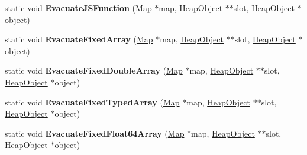 \begin{DoxyCompactItemize}
\item 
static void {\bfseries Evacuate\+J\+S\+Function} (\hyperlink{classv8_1_1internal_1_1_map}{Map} $\ast$map, \hyperlink{classv8_1_1internal_1_1_heap_object}{Heap\+Object} $\ast$$\ast$slot, \hyperlink{classv8_1_1internal_1_1_heap_object}{Heap\+Object} $\ast$object)\hypertarget{classv8_1_1internal_1_1_scavenging_visitor_ada703fc6e47357101f76c95bcae815ad}{}\label{classv8_1_1internal_1_1_scavenging_visitor_ada703fc6e47357101f76c95bcae815ad}

\item 
static void {\bfseries Evacuate\+Fixed\+Array} (\hyperlink{classv8_1_1internal_1_1_map}{Map} $\ast$map, \hyperlink{classv8_1_1internal_1_1_heap_object}{Heap\+Object} $\ast$$\ast$slot, \hyperlink{classv8_1_1internal_1_1_heap_object}{Heap\+Object} $\ast$object)\hypertarget{classv8_1_1internal_1_1_scavenging_visitor_aab939eeca2af916997187df2caeb73b7}{}\label{classv8_1_1internal_1_1_scavenging_visitor_aab939eeca2af916997187df2caeb73b7}

\item 
static void {\bfseries Evacuate\+Fixed\+Double\+Array} (\hyperlink{classv8_1_1internal_1_1_map}{Map} $\ast$map, \hyperlink{classv8_1_1internal_1_1_heap_object}{Heap\+Object} $\ast$$\ast$slot, \hyperlink{classv8_1_1internal_1_1_heap_object}{Heap\+Object} $\ast$object)\hypertarget{classv8_1_1internal_1_1_scavenging_visitor_a9cba9e793eee8fda527e8162cf75698b}{}\label{classv8_1_1internal_1_1_scavenging_visitor_a9cba9e793eee8fda527e8162cf75698b}

\item 
static void {\bfseries Evacuate\+Fixed\+Typed\+Array} (\hyperlink{classv8_1_1internal_1_1_map}{Map} $\ast$map, \hyperlink{classv8_1_1internal_1_1_heap_object}{Heap\+Object} $\ast$$\ast$slot, \hyperlink{classv8_1_1internal_1_1_heap_object}{Heap\+Object} $\ast$object)\hypertarget{classv8_1_1internal_1_1_scavenging_visitor_aef5f6b260f3f9110d6dc39771b0a1248}{}\label{classv8_1_1internal_1_1_scavenging_visitor_aef5f6b260f3f9110d6dc39771b0a1248}

\item 
static void {\bfseries Evacuate\+Fixed\+Float64\+Array} (\hyperlink{classv8_1_1internal_1_1_map}{Map} $\ast$map, \hyperlink{classv8_1_1internal_1_1_heap_object}{Heap\+Object} $\ast$$\ast$slot, \hyperlink{classv8_1_1internal_1_1_heap_object}{Heap\+Object} $\ast$object)\hypertarget{classv8_1_1internal_1_1_scavenging_visitor_a2258c0af0e55f159f5acf31fd17dcd07}{}\label{classv8_1_1internal_1_1_scavenging_visitor_a2258c0af0e55f159f5acf31fd17dcd07}


\end{DoxyCompactItemize}
